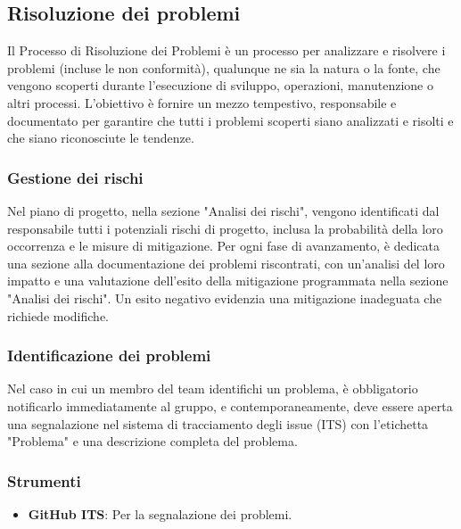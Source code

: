 \subsection{Risoluzione dei problemi}
Il Processo di Risoluzione dei Problemi è un processo per analizzare e risolvere i problemi (incluse le non conformità), qualunque ne sia la natura o la fonte, che vengono scoperti durante l'esecuzione di sviluppo, operazioni, manutenzione o altri processi. L'obiettivo è fornire un mezzo tempestivo, responsabile e documentato per garantire che tutti i problemi scoperti siano analizzati e risolti e che siano riconosciute le tendenze.

\subsubsection{Gestione dei rischi}
Nel piano di progetto, nella sezione "Analisi dei rischi", vengono identificati dal responsabile tutti i potenziali rischi di progetto, inclusa la probabilità della loro occorrenza e le misure di mitigazione. Per ogni fase di avanzamento, è dedicata una sezione alla documentazione dei problemi riscontrati, con un'analisi del loro impatto e una valutazione dell'esito della mitigazione programmata nella sezione "Analisi dei rischi". Un esito negativo evidenzia una mitigazione inadeguata che richiede modifiche.

\subsubsection{Identificazione dei problemi}
Nel caso in cui un membro del team identifichi un problema, è obbligatorio notificarlo immediatamente al gruppo, e contemporaneamente, deve essere aperta una segnalazione nel sistema di tracciamento degli issue (ITS) con l'etichetta "Problema" e una descrizione completa del problema.

\subsubsection{Strumenti}
\begin{itemize}
    \item \textbf{GitHub ITS}: Per la segnalazione dei problemi.
\end{itemize}